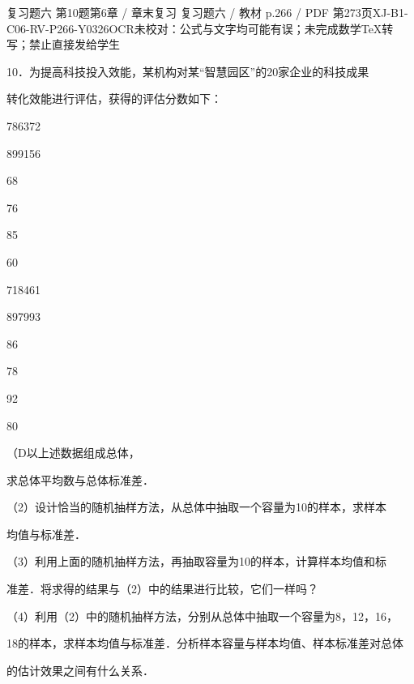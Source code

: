 \begin{bankitem}{复习题六 第10题}{第6章 / 章末复习 复习题六 / 教材 p.266 / PDF 第273页}{XJ-B1-C06-RV-P266-Y0326}{OCR未校对：公式与文字均可能有误；未完成数学TeX转写；禁止直接发给学生}
\begin{ocrdraft}
\par
10．为提高科技投入效能，某机构对某“智慧园区”的20家企业的科技成果
\par
转化效能进行评估，获得的评估分数如下：
\par
786372
\par
899156
\par
68
\par
76
\par
85
\par
60
\par
718461
\par
897993
\par
86
\par
78
\par
92
\par
80
\par
（D以上述数据组成总体，
\par
求总体平均数与总体标准差．
\par
（2）设计恰当的随机抽样方法，从总体中抽取一个容量为10的样本，求样本
\par
均值与标准差．
\par
（3）利用上面的随机抽样方法，再抽取容量为10的样本，计算样本均值和标
\par
准差．将求得的结果与（2）中的结果进行比较，它们一样吗？
\par
（4）利用（2）中的随机抽样方法，分别从总体中抽取一个容量为8，12，16，
\par
18的样本，求样本均值与标准差．分析样本容量与样本均值、样本标准差对总体
\par
的估计效果之间有什么关系．
\end{ocrdraft}
\end{bankitem}
